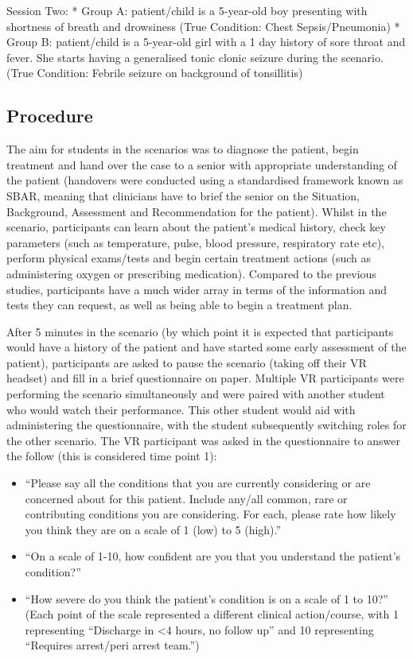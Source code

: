 \documentclass[a4paper, nobind]{templates/ociamthesis}
\providecommand{\tightlist}{%
  \setlength{\itemsep}{0pt}\setlength{\parskip}{0pt}}
\begin{document}
Session Two:
* Group A: patient/child is a 5-year-old boy presenting with shortness of breath and drowsiness (True Condition: Chest Sepsis/Pneumonia)
* Group B: patient/child is a 5-year-old girl with a 1 day history of sore throat and fever. She starts having a generalised tonic clonic seizure during the scenario. (True Condition: Febrile seizure on background of tonsillitis)

\subsection*{Procedure}\label{procedure-2}

The aim for students in the scenarios was to diagnose the patient, begin treatment and hand over the case to a senior with appropriate understanding of the patient (handovers were conducted using a standardised framework known as SBAR, meaning that clinicians have to brief the senior on the Situation, Background, Assessment and Recommendation for the patient). Whilst in the scenario, participants can learn about the patient's medical history, check key parameters (such as temperature, pulse, blood pressure, respiratory rate etc), perform physical exams/tests and begin certain treatment actions (such as administering oxygen or prescribing medication). Compared to the previous studies, participants have a much wider array in terms of the information and tests they can request, as well as being able to begin a treatment plan.

After 5 minutes in the scenario (by which point it is expected that participants would have a history of the patient and have started some early assessment of the patient), participants are asked to pause the scenario (taking off their VR headset) and fill in a brief questionnaire on paper. Multiple VR participants were performing the scenario simultaneously and were paired with another student who would watch their performance. This other student would aid with administering the questionnaire, with the student subsequently switching roles for the other scenario. The VR participant was asked in the questionnaire to answer the follow (this is considered time point 1):

\begin{itemize}
\tightlist
\item
  ``Please say all the conditions that you are currently considering or are concerned about for this patient. Include any/all common, rare or contributing conditions you are considering. For each, please rate how likely you think they are on a scale of 1 (low) to 5 (high).''
\item
  ``On a scale of 1-10, how confident are you that you understand the patient's condition?''
\item
  ``How severe do you think the patient's condition is on a scale of 1 to 10?'' (Each point of the scale represented a different clinical action/course, with 1 representing ``Discharge in \textless4 hours, no follow up'' and 10 representing ``Requires arrest/peri arrest team.'')
\end{itemize}
\end{document}
